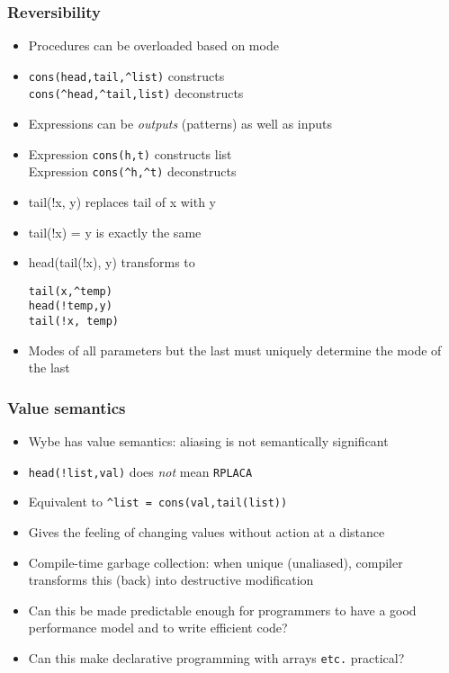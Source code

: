 \documentclass[12pt]{beamer}
\begin{document}
\begin{frame}
\frametitle{Reversibility}
\begin{itemize}
\item Procedures can be overloaded based on mode
\item \texttt{cons(head,tail,\^{ }list)}  constructs \\
\texttt{cons(\^{ }head,\^{ }tail,list)}  deconstructs \\
\item Expressions can be \emph{outputs} (patterns) as well as inputs
\item Expression \texttt{cons(h,t)} constructs list \\
Expression \texttt{cons(\^{ }h,\^{ }t)} deconstructs
\item tail(!x, y) replaces tail of x with y
\item tail(!x) = y is exactly the same
\item head(tail(!x), y) \quad transforms to \quad
  \begin{minipage}[c]{0.4\linewidth}
  \texttt{tail(x,\^{ }temp)} \\
  \texttt{head(!temp,y)} \\
  \texttt{tail(!x, temp)}
  \end{minipage}
\item Modes of all parameters but the last must uniquely determine the
  mode of the last
\end{itemize}
\end{frame}


\begin{frame}
\frametitle{Value semantics}
\begin{itemize}
\item Wybe has value semantics:  aliasing is not semantically significant
\item \texttt{head(!list,val)} does \emph{not} mean \texttt{RPLACA}
\item Equivalent to \texttt{\^{ }list = cons(val,tail(list))}
\item Gives the feeling of changing values without action at a distance
\item Compile-time garbage collection:  when unique (unaliased),
  compiler transforms this (back) into destructive modification
\item Can this be made predictable enough for programmers
  to have a good performance model and to write efficient code?
\item Can this make declarative programming with arrays \texttt{etc.} practical?
\end{itemize}
\end{frame}
\end{document}
